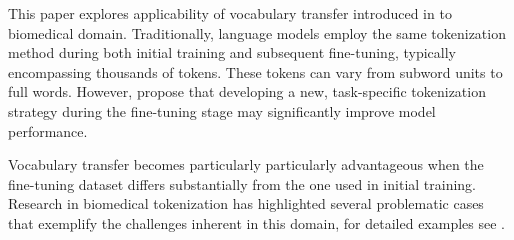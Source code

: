 \documentclass[11pt]{article}
\begin{document}
This paper explores applicability of vocabulary transfer introduced in \citet{mosin2023fine} to biomedical domain. Traditionally, language models employ the same tokenization method during both initial training and subsequent fine-tuning, typically encompassing thousands of tokens. These tokens can vary from subword units to full words. However, \citet{mosin2023fine} propose that developing a new, task-specific tokenization strategy during the fine-tuning stage may significantly improve model performance.

Vocabulary transfer becomes particularly particularly advantageous when the fine-tuning dataset differs substantially from the one used in initial training. Research in biomedical tokenization has highlighted several problematic cases that exemplify the challenges inherent in this domain, for detailed examples see \citet{Lopez2015}. 


\end{document}
